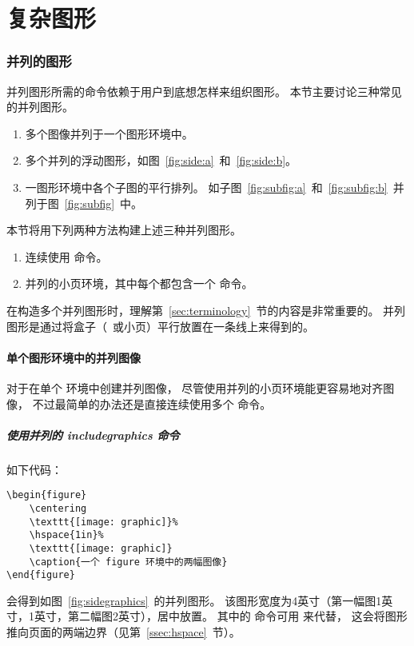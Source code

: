 \part{复杂图形}

\section{并列的图形}\label{sec:sidebyside}

并列图形所需的命令依赖于用户到底想怎样来组织图形。
本节主要讨论三种常见的并列图形。
\begin{enumerate}
	\item 多个图像并列于一个图形环境中。
	\item 多个并列的浮动图形，如图~\ref{fig:side:a}~和~\ref{fig:side:b}。
	\item 一图形环境中各个子图的平行排列。
	如子图~\ref{fig:subfig:a}~和~\ref{fig:subfig:b}~并列于图~\ref{fig:subfig}~中。
\end{enumerate}

本节将用下列两种方法构建上述三种并列图形。
\begin{enumerate}
	\item 连续使用  命令。
	\item 并列的小页环境，其中每个都包含一个  命令。
\end{enumerate}
在构造多个并列图形时，理解第~\ref{sec:terminology}~节的内容是非常重要的。
并列图形是通过将盒子（~或小页）平行放置在一条线上来得到的。

\subsection{单个图形环境中的并列图像}\label{ssec:sidegraphics-singlefig}

对于在单个  环境中创建并列图像，
尽管使用并列的小页环境能更容易地对齐图像，
不过最简单的办法还是直接连续使用多个 命令。

\subsubsection{使用并列的 includegraphics 命令}

如下代码：
\begin{lstlisting}
\begin{figure} 
	\centering 
	\texttt{[image: graphic]}% 
	\hspace{1in}% 
	\texttt{[image: graphic]} 
	\caption{一个 figure 环境中的两幅图像} 
\end{figure}
\end{lstlisting}
会得到如图~\ref{fig:sidegraphics}~的并列图形。
该图形宽度为4英寸（第一幅图1英寸，1英寸，第二幅图2英寸），居中放置。
其中的  命令可用  来代替，
这会将图形推向页面的两端边界（见第~\ref{ssec:hspace}~节）。

